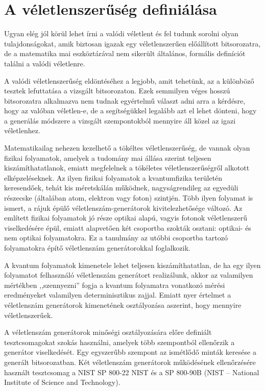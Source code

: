 \documentclass[12pt,a4paper,oneside]{article}
\begin{document}
\section*{A véletlenszerűség definiálása}
Ugyan elég jól körül lehet írni a valódi véletlent és fel tudunk sorolni olyan tulajdonságokat, amik biztosan igazak egy véletlenszerűen előállított bitsorozatra, de a matematika mai eszköztárával nem sikerült általános, formális definíciót találni a valódi véletlenre.
\par
A valódi véletlenszerűség eldöntéséhez a legjobb, amit tehetünk, az a különböző tesztek lefuttatása a vizsgált bitsorozaton. Ezek semmilyen véges hosszú bitsorozatra alkalmazva nem tudnak egyértelmű választ adni arra a kérdésre, hogy az valóban véletlen-e, de a segítségükkel legalább azt el lehet dönteni, hogy a generálás módszere a vizsgált szempontokból mennyire áll közel az igazi véletlenhez.
\par
Matematikailag nehezen kezelhető a tökéltes véletlenszerűség, de vannak olyan fizikai folyamatok, amelyek a tudomány mai állása szerint teljesen kiszámíthatatlanok, emiatt megfelelnek a tökéletes véletlenszerűségről alkotott elképzeléseknek. Az ilyen fizikai folyamatok a kvantumfizika területén keresendőek, tehát kis méretskálán működnek, nagyságrendileg az egyedüli részecske (általában atom, elektron vagy foton) szintjén. Több ilyen folyamat is ismert, a rájuk épülő véletlenszám-generátorok kivitelezhetősége változó. Az említett fizikai folyamatok jó része optikai alapú, vagyis fotonok véletlenszerű viselkedésére épül, emiatt alapvetően két csoportba szokták osztani: optikai- és nem optikai folyamatokra. Ez a tanulmány az utóbbi csoportba tartozó folyamatokra építő véletlenszám generátorokkal foglalkozik.
\par
A kvantum folyamatok kimenetele lehet teljesen kiszámíthatatlan, de ha egy ilyen folyamatot felhasználó véletlenszám generátort realizálunk, akkor az valamilyen mértékben ,,szennyezni'' fogja a kvantum folyamatra vonatkozó mérési eredményeket valamilyen determinisztikus zajjal. Emiatt nyer értelmet a véletlenszám generátorok kimenetének osztályozása aszerint, hogy mennyire véletlenszerűek.
\par
A véletlenszám generátorok minőségi osztályozására előre definiált tesztcsomagokat szokás használni, amelyek több szempontból ellenőrzik a generátor viselkedését. Egy egyszerűbb szempont az ismétlődő minták keresése a generált bitsorozatban. Két véletlenszám generátorok működésének ellenőrzésére használt tesztcsomag a NIST SP 800-22 NIST \cite{nist1} és a SP 800-90B \cite{nist2} (NIST -- National Institute of Science and Technology).
\end{document}
